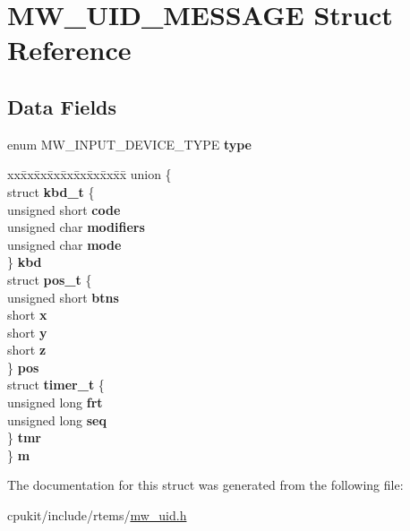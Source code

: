 \hypertarget{structMW__UID__MESSAGE}{}\section{M\+W\+\_\+\+U\+I\+D\+\_\+\+M\+E\+S\+S\+A\+GE Struct Reference}
\label{structMW__UID__MESSAGE}
\subsection*{Data Fields}
\begin{DoxyCompactItemize}
\item 
\mbox{\label{structMW__UID__MESSAGE_a02234f1f516f346e5add552182d4055f}} 
enum M\+W\+\_\+\+I\+N\+P\+U\+T\+\_\+\+D\+E\+V\+I\+C\+E\+\_\+\+T\+Y\+PE {\bfseries type}
\item 
\mbox{\label{structMW__UID__MESSAGE_abddd4fd9a91c664bf257b9254b9407fd}} 
\begin{tabbing}
xx\=xx\=xx\=xx\=xx\=xx\=xx\=xx\=xx\=\kill
union \{\\
\>struct {\bfseries kbd\_t} \{\\
\>\>unsigned short {\bfseries code}\\
\>\>unsigned char {\bfseries modifiers}\\
\>\>unsigned char {\bfseries mode}\\
\>\} {\bfseries kbd}\\
\>struct {\bfseries pos\_t} \{\\
\>\>unsigned short {\bfseries btns}\\
\>\>short {\bfseries x}\\
\>\>short {\bfseries y}\\
\>\>short {\bfseries z}\\
\>\} {\bfseries pos}\\
\>struct {\bfseries timer\_t} \{\\
\>\>unsigned long {\bfseries frt}\\
\>\>unsigned long {\bfseries seq}\\
\>\} {\bfseries tmr}\\
\} {\bfseries m}\\

\end{tabbing}\end{DoxyCompactItemize}


The documentation for this struct was generated from the following file\+:\begin{DoxyCompactItemize}
\item 
cpukit/include/rtems/\mbox{\hyperlink{mw__uid_8h}{mw\+\_\+uid.\+h}}\end{DoxyCompactItemize}
